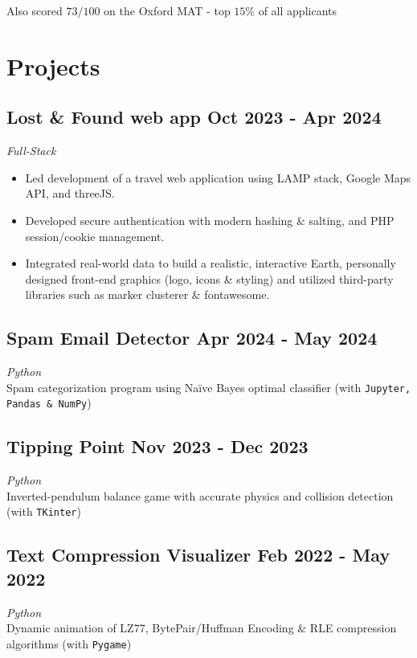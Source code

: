 \documentclass[a4paper,10pt]{article}
\begin{document}
\vspace{1ex}
\hspace{4ex} Also scored $73/100$ on the Oxford MAT - top $15\%$ of all applicants    
\vspace{-2mm}

\section*{ Projects}

\subsection*{Lost \& Found web app \hfill Oct 2023 - Apr 2024}
\textit{Full-Stack}
\begin{itemize}
\vspace{-2mm}
\setlength\itemsep{-0.7ex}
    \item Led development of a travel web application using LAMP stack, Google Maps API, and threeJS.
    \item Developed secure authentication with modern hashing \& salting, and PHP session/cookie management.
    \item Integrated real-world data to build a realistic, interactive Earth, personally designed front-end graphics (logo, icons \& styling) and utilized third-party libraries such as marker clusterer \& fontawesome.
\end{itemize}
 
\subsection*{Spam Email Detector \hfill Apr 2024 - May 2024}
\textit{Python} \\
Spam categorization program using Naïve Bayes optimal classifier (with \texttt{Jupyter, Pandas \& NumPy})

\subsection*{Tipping Point \hfill Nov 2023 - Dec 2023}
\textit{Python} \\
Inverted-pendulum balance game with accurate physics and collision detection (with \texttt{TKinter})

\subsection*{Text Compression Visualizer \hfill Feb 2022 - May 2022}
\textit{Python} \\
Dynamic animation of LZ77, BytePair/Huffman Encoding \& RLE compression algorithms (with \texttt{Pygame})
\end{document}

